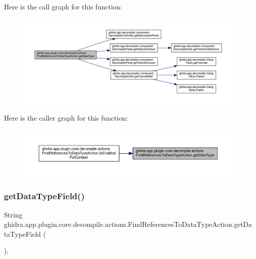 Here is the call graph for this function\+:
\nopagebreak
\begin{figure}[H]
\begin{center}
\leavevmode
\includegraphics[width=350pt]{classghidra_1_1app_1_1plugin_1_1core_1_1decompile_1_1actions_1_1_find_references_to_data_type_action_a7a6072e0b054bef56b8a5dbcef1e6f4d_cgraph}
\end{center}
\end{figure}
Here is the caller graph for this function\+:
\nopagebreak
\begin{figure}[H]
\begin{center}
\leavevmode
\includegraphics[width=350pt]{classghidra_1_1app_1_1plugin_1_1core_1_1decompile_1_1actions_1_1_find_references_to_data_type_action_a7a6072e0b054bef56b8a5dbcef1e6f4d_icgraph}
\end{center}
\end{figure}
\mbox{\label{classghidra_1_1app_1_1plugin_1_1core_1_1decompile_1_1actions_1_1_find_references_to_data_type_action_ad65bcc7269c569b8cbfdc7c7355f6af9}} 
\subsubsection{\texorpdfstring{getDataTypeField()}{getDataTypeField()}}
{\footnotesize\ttfamily String ghidra.\+app.\+plugin.\+core.\+decompile.\+actions.\+Find\+References\+To\+Data\+Type\+Action.\+get\+Data\+Type\+Field (\begin{DoxyParamCaption}{ }\end{DoxyParamCaption})\hspace{0.3cm}{\ttfamily [inline]}, {\ttfamily [protected]}}




